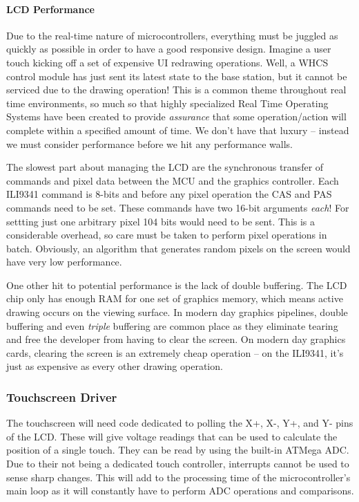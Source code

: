 \paragraph{LCD Performance}
\label{par:lcd-perf}
Due to the real-time nature of microcontrollers, everything must be juggled as
quickly as possible in order to have a good responsive design. Imagine a user
touch kicking off a set of expensive UI redrawing operations. Well, a WHCS
control module has just sent its latest state to the base station, but it
cannot be serviced due to the drawing operation! This is a common theme
throughout real time environments, so much so that highly specialized Real Time
Operating Systems have been created to provide \emph{assurance} that some
operation/action will complete within a specified amount of time. We don't have that luxury -- instead we must consider performance before we hit any performance walls.

The slowest part about managing the LCD are the synchronous transfer of
commands and pixel data between the MCU and the graphics controller. Each
ILI9341 command is 8-bits and before any pixel operation the CAS and PAS
commands need to be set. These commands have two 16-bit arguments \emph{each}!
For settting just one arbitrary pixel 104 bits would need to be sent. This is a
considerable overhead, so care must be taken to perform pixel operations in
batch. Obviously, an algorithm that generates random pixels on the screen would have very
low performance.

One other hit to potential performance is the lack of double buffering. The LCD
chip only has enough RAM for one set of graphics memory, which means active
drawing occurs on the viewing surface. In modern day graphics pipelines, double
buffering and even \emph{triple} buffering are common place as they eliminate
tearing and free the developer from having to clear the screen. On modern day
graphics cards, clearing the screen is an extremely cheap operation -- on the
ILI9341, it's just as expensive as every other drawing operation.


\subsubsection{Touchscreen Driver}
The touchscreen will need code dedicated to polling the X+, X-, Y+, and Y- pins
of the LCD. These will give voltage readings that can be used to calculate the
position of a single touch. They can be read by using the built-in ATMega ADC.
Due to their not being a dedicated touch controller,
interrupts cannot be used to sense sharp changes. This will add to the
processing time of the microcontroller's main loop as it will constantly have
to perform ADC operations and comparisons.

